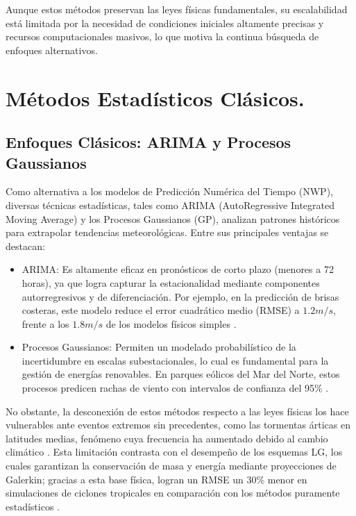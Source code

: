 Aunque estos métodos preservan las leyes físicas fundamentales, su escalabilidad está limitada por la necesidad de condiciones iniciales altamente precisas y recursos computacionales masivos, lo que motiva la continua búsqueda de enfoques alternativos.

\section{Métodos Estadísticos Clásicos.}
\subsection{Enfoques Clásicos: ARIMA y Procesos Gaussianos}

Como alternativa a los modelos de Predicción Numérica del Tiempo (NWP), diversas técnicas estadísticas, tales como ARIMA (AutoRegressive Integrated Moving Average) y los Procesos Gaussianos (GP), analizan patrones históricos para extrapolar tendencias meteorológicas. Entre sus principales ventajas se destacan:

\begin{itemize}
    \item ARIMA: Es altamente eficaz en pronósticos de corto plazo (menores a 72 horas), ya que logra capturar la estacionalidad mediante componentes autorregresivos y de diferenciación. Por ejemplo, en la predicción de brisas costeras, este modelo reduce el error cuadrático medio (RMSE) a $1.2 m/s$, frente a los $1.8 m/s$ de los modelos físicos simples \citep{montero2021arima}.
    
    \item Procesos Gaussianos: Permiten un modelado probabilístico de la incertidumbre en escalas subestacionales, lo cual es fundamental para la gestión de energías renovables. En parques eólicos del Mar del Norte, estos procesos predicen rachas de viento con intervalos de confianza del 95\% \citep{hojstrup2020gaussian}.
\end{itemize}

No obstante, la desconexión de estos métodos respecto a las leyes físicas los hace vulnerables ante eventos extremos sin precedentes, como las tormentas árticas en latitudes medias, fenómeno cuya frecuencia ha aumentado debido al cambio climático \citep{ipcc2023synthesis}. Esta limitación contrasta con el desempeño de los esquemas LG, los cuales garantizan la conservación de masa y energía mediante proyecciones de Galerkin; gracias a esta base física, logran un RMSE un 30\% menor en simulaciones de ciclones tropicales en comparación con los métodos puramente estadísticos \citep{bermejo2016lagrange}.

